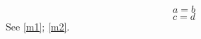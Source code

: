 \documentclass{mnras}
\begin{document}
\begin{equation}a=b\nonumber\label{m1}\end{equation}
\begin{equation}c=d\label{m2}\end{equation}
See \ref{m1}; \ref{m2}.
\end{document}
